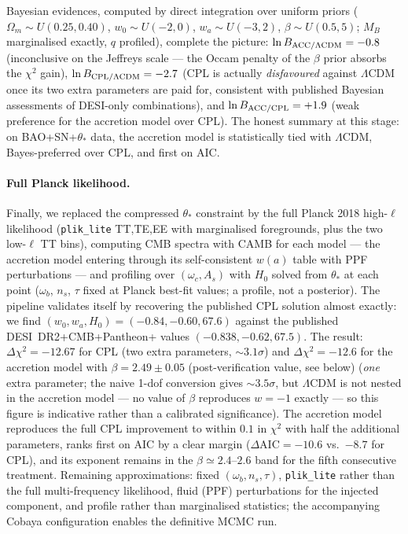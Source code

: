 \documentclass[11pt]{article}
\begin{document}
Bayesian evidences, computed by direct integration over uniform priors ($\Omega_m \sim U(0.25,0.40)$, $w_0 \sim U(-2,0)$, $w_a \sim U(-3,2)$, $\beta \sim U(0.5,5)$; $M_B$ marginalised exactly, $q$ profiled), complete the picture: $\ln B_{\rm ACC/\Lambda CDM} = -0.8$ (inconclusive on the Jeffreys scale --- the Occam penalty of the $\beta$ prior absorbs the $\chi^2$ gain), $\ln B_{\rm CPL/\Lambda CDM} = -2.7$ (CPL is actually \emph{disfavoured} against $\Lambda$CDM once its two extra parameters are paid for, consistent with published Bayesian assessments of DESI-only combinations), and $\ln B_{\rm ACC/CPL} = +1.9$ (weak preference for the accretion model over CPL). The honest summary at this stage: on BAO+SN+$\theta_*$ data, the accretion model is statistically tied with $\Lambda$CDM, Bayes-preferred over CPL, and first on AIC.

\paragraph{Full Planck likelihood.} Finally, we replaced the compressed $\theta_*$ constraint by the full Planck 2018 high-$\ell$ likelihood (\texttt{plik\_lite} TT,TE,EE with marginalised foregrounds, plus the two low-$\ell$ TT bins), computing CMB spectra with CAMB for each model --- the accretion model entering through its self-consistent $w(a)$ table with PPF perturbations --- and profiling over $(\omega_c, A_s)$ with $H_0$ solved from $\theta_*$ at each point ($\omega_b$, $n_s$, $\tau$ fixed at Planck best-fit values; a profile, not a posterior). The pipeline validates itself by recovering the published CPL solution almost exactly: we find $(w_0, w_a, H_0) = (-0.84, -0.60, 67.6)$ against the published DESI~DR2+CMB+Pantheon+ values $(-0.838, -0.62, 67.5)$. The result: $\Delta\chi^2 = -12.67$ for CPL (two extra parameters, $\sim 3.1\sigma$) and $\Delta\chi^2 = -12.6$ for the accretion model with $\beta = 2.49 \pm 0.05$ (post-verification value, see below) (\emph{one} extra parameter; the naive 1-dof conversion gives $\sim 3.5\sigma$, but $\Lambda$CDM is not nested in the accretion model --- no value of $\beta$ reproduces $w=-1$ exactly --- so this figure is indicative rather than a calibrated significance). The accretion model reproduces the full CPL improvement to within $0.1$ in $\chi^2$ with half the additional parameters, ranks first on AIC by a clear margin ($\Delta\mathrm{AIC} = -10.6$ vs.\ $-8.7$ for CPL), and its exponent remains in the $\beta \simeq 2.4$--$2.6$ band for the fifth consecutive treatment. Remaining approximations: fixed $(\omega_b, n_s, \tau)$, \texttt{plik\_lite} rather than the full multi-frequency likelihood, fluid (PPF) perturbations for the injected component, and profile rather than marginalised statistics; the accompanying Cobaya configuration enables the definitive MCMC run.
\end{document}
